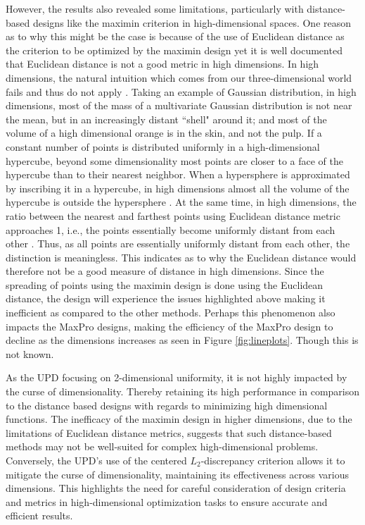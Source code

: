 \documentclass [PhD] {package/uclathes}
\begin{document}
However, the results also revealed some limitations, particularly with distance-based designs like the maximin criterion in high-dimensional spaces. One reason as to why this might be the case is because of the use of Euclidean distance as the criterion to be optimized by the maximin design yet it is well documented that Euclidean distance is not a good metric in high dimensions. In high dimensions, the natural intuition which comes from our three-dimensional world fails and thus do not apply \parencite{domingos2012few}. Taking an example of Gaussian distribution, in high dimensions, most of the mass of a multivariate Gaussian distribution is not near the mean, but in an increasingly distant ``shell" around it; and most of the volume of a high dimensional orange is in the skin, and not the pulp. If a constant number of points is distributed uniformly in a high-dimensional hypercube, beyond some dimensionality most points are closer to a face of the hypercube than to their nearest neighbor. When a hypersphere is approximated by inscribing it in a hypercube, in high dimensions almost all the volume of the hypercube is outside the hypersphere \parencite{domingos2012few}. At the same time, in high dimensions, the ratio between the nearest and farthest points using Euclidean distance metric approaches 1, i.e., the points essentially become uniformly distant from each other \parencite{aggarwal2001surprising}. Thus, as all points are essentially uniformly distant from each other, the distinction is meaningless. This indicates as to why the Euclidean distance would therefore not be a good measure of distance in high dimensions. Since the spreading of points using the maximin design is done using the Euclidean distance,%
the design will experience the issues highlighted above making it  inefficient as compared to the other methods. Perhaps this phenomenon also impacts the MaxPro designs, making the efficiency of the MaxPro design to decline as the dimensions increases as seen in Figure \ref{fig:lineplots}. Though this is not known.

As the UPD focusing on 2-dimensional uniformity, it is not highly impacted by the curse of dimensionality. Thereby retaining its high performance in comparison to the distance based designs with regards to minimizing high dimensional functions. The inefficacy of the maximin design in higher dimensions, due to the limitations of Euclidean distance metrics, suggests that such distance-based methods may not be well-suited for complex high-dimensional problems. Conversely, the UPD's use of the centered $L_2$-discrepancy criterion allows it to mitigate the curse of dimensionality, maintaining its effectiveness across various dimensions. This highlights the need for careful consideration of design criteria and metrics in high-dimensional optimization tasks to ensure accurate and efficient results.
\end{document}
